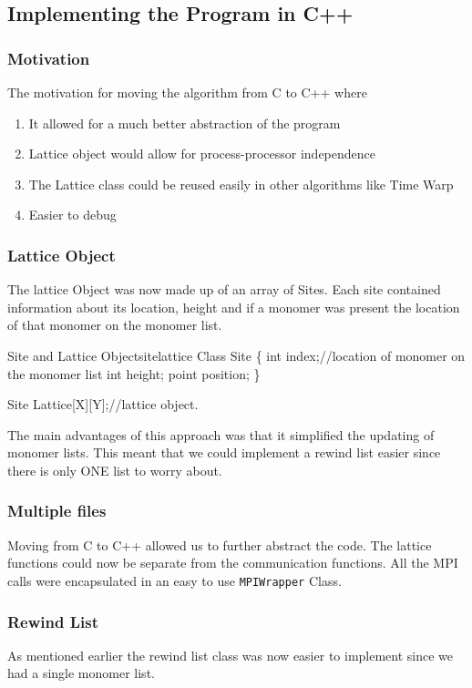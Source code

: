\subsection{Implementing the Program in C++}
\subsubsection{Motivation}
The motivation for moving the algorithm from C to C++ where
\begin{enumerate}
\item It allowed for a much better abstraction of the program
\item Lattice object would allow for process-processor independence
\item The Lattice class could be reused easily in other algorithms like Time Warp
\item Easier to debug
\end{enumerate}

\subsubsection{Lattice Object}
The lattice Object was now made up of an array of Sites. Each site contained information about its location, height and if a monomer was present the location of that monomer on the monomer list.

\begin{code}{Site and Lattice Object}{sitelattice}
Class Site
\{
    int index;//location of monomer on the monomer list
    int height;
    point position;
\}

Site Lattice[X][Y];//lattice object.
\end{code}

The main advantages of this approach was that it simplified the updating of monomer lists. This meant that we could implement a rewind list easier since there is only ONE list to worry about.

\subsubsection{Multiple files}
Moving from C to C++ allowed us to further abstract the code. The lattice functions could now be separate from the communication functions. All the MPI calls were encapsulated in an easy to use \texttt{MPIWrapper} Class.

\subsubsection{Rewind List}
As mentioned earlier the rewind list class was now easier to implement since we had a single monomer list.

